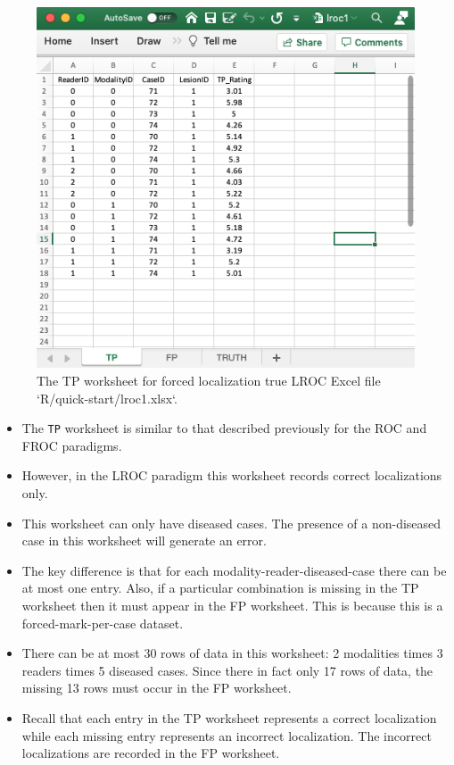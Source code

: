 \documentclass[
]{book}
\providecommand{\tightlist}{%
  \setlength{\itemsep}{0pt}\setlength{\parskip}{0pt}}
\begin{document}
\begin{figure}

{\centering \includegraphics[width=1\linewidth]{images/quick-start/lroc1TP} 

}

\caption{The TP worksheet for forced localization true LROC Excel file `R/quick-start/lroc1.xlsx`.}\label{fig:quick-start-lroc-tp1}
\end{figure}

\begin{itemize}
\tightlist
\item
  The \texttt{TP} worksheet is similar to that described previously for the ROC and FROC paradigms.
\item
  However, in the LROC paradigm this worksheet records correct localizations only.
\item
  This worksheet can only have diseased cases. The presence of a non-diseased case in this worksheet will generate an error.
\item
  The key difference is that for each modality-reader-diseased-case there can be at most one entry. Also, if a particular combination is missing in the TP worksheet then it must appear in the FP worksheet. This is because this is a forced-mark-per-case dataset.
\item
  There can be at most 30 rows of data in this worksheet: 2 modalities times 3 readers times 5 diseased cases. Since there in fact only 17 rows of data, the missing 13 rows must occur in the FP worksheet.
\item
  Recall that each entry in the TP worksheet represents a correct localization while each missing entry represents an incorrect localization. The incorrect localizations are recorded in the FP worksheet.
\end{itemize}
\end{document}

